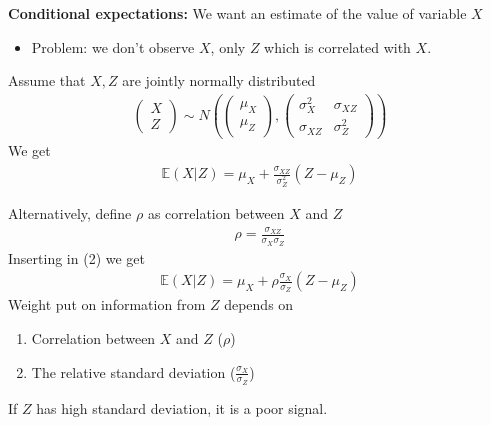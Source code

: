 \documentclass{beamer}
\begin{document}
\begin{frame}
  \textbf{Conditional expectations:} We want an estimate of the value of variable $X$ 
  \begin{itemize}
    \item Problem: we don't observe $X$, only $Z$ which is correlated with $X$.
  \end{itemize}
  \medskip
  Assume that $X,Z$ are jointly normally distributed
  \begin{align}
    \begin{pmatrix}      X \\Z     \end{pmatrix}
    \sim N \left ( \begin{pmatrix}      \mu_X \\ \mu_Z    \end{pmatrix},
    \begin{pmatrix}       \sigma^2_X & \sigma_{XZ} \\ \sigma_{XZ} & \sigma^2_Z     \end{pmatrix} \right )
  \end{align}  
  \medskip
  We get
  \begin{align}
    \mathbb{E}(X|Z) = \mu_X + \frac{\sigma_{XZ}}{\sigma^2_Z}(Z-\mu_Z)
  \end{align}
\end{frame}

\begin{frame}
  Alternatively, define $\rho$ as correlation between $X$ and $Z$
  \begin{align}
    \rho= \frac{\sigma_{XZ}}{\sigma_X \sigma_Z}
  \end{align}
  Inserting in (2) we get
  \begin{align}
    \mathbb{E}(X|Z) = \mu_X + \rho \frac{\sigma_X}{\sigma_Z}(Z-\mu_Z)
  \end{align}
  \medskip
  Weight put on information from $Z$ depends on
  \begin{enumerate}
    \item Correlation between $X$ and $Z$ ($\rho$)
    \item The relative standard deviation ($\frac{\sigma_X}{\sigma_Z}$)
  \end{enumerate}
  If $Z$ has high standard deviation, it is a poor signal.
\end{frame}
\end{document}

